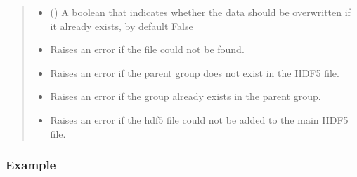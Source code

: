 \documentclass[letterpaper,10pt,english]{sphinxmanual}
\begin{document}
\begin{fulllineitems}
\begin{fulllineitems}
\begin{quote}
\begin{description}
\begin{itemize}
\item {} 
\sphinxAtStartPar
{} (\sphinxstyleliteralemphasis{\sphinxupquote{, }}) \textendash{} A boolean that indicates whether the data should be overwritten if it already exists, by default False

\end{itemize}

\begin{itemize}
\item {} 
\sphinxAtStartPar
{} \textendash{} Raises an error if the file could not be found.

\item {} 
\sphinxAtStartPar
{} \textendash{} Raises an error if the parent group does not exist in the HDF5 file.

\item {} 
\sphinxAtStartPar
{} \textendash{} Raises an error if the group already exists in the parent group.

\item {} 
\sphinxAtStartPar
{} \textendash{} Raises an error if the hdf5 file could not be added to the main HDF5 file.

\end{itemize}

\end{description}\end{quote}
\subsubsection*{Example}

\begin{sphinxVerbatim}[commandchars=\\\{\}]
   
  
\end{sphinxVerbatim}


\end{fulllineitems}
\end{fulllineitems}
\end{document}
